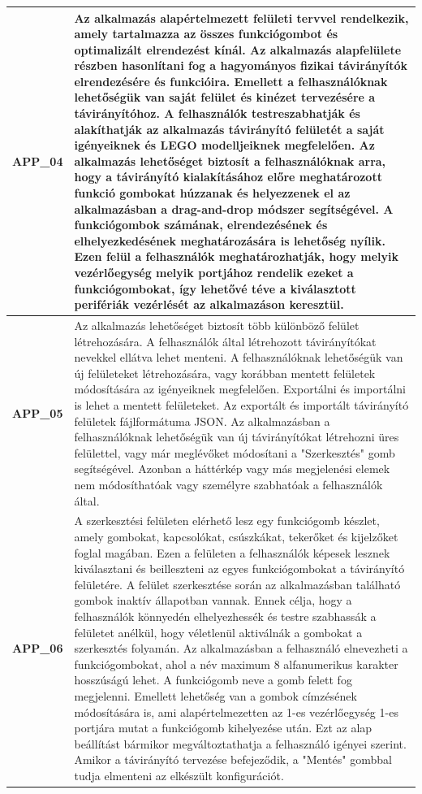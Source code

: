 \documentclass{article}
\begin{document}
\begin{longtable}{|c|p{14cm}|}
       \textbf{APP\_04}  & Az alkalmazás alapértelmezett felületi tervvel rendelkezik, amely tartalmazza az összes funkciógombot és optimalizált elrendezést kínál. Az alkalmazás alapfelülete részben hasonlítani fog a hagyományos fizikai távirányítók elrendezésére és funkcióira. Emellett a felhasználóknak lehetőségük van saját felület és kinézet tervezésére a távirányítóhoz. A felhasználók testreszabhatják és alakíthatják az alkalmazás távirányító felületét a saját igényeiknek és LEGO modelljeiknek megfelelően. Az alkalmazás lehetőséget biztosít a felhasználóknak arra, hogy a távirányító kialakításához előre meghatározott funkció gombokat húzzanak és helyezzenek el az alkalmazásban a drag-and-drop módszer segítségével. A funkciógombok számának, elrendezésének és elhelyezkedésének meghatározására is lehetőség nyílik. Ezen felül a felhasználók meghatározhatják, hogy melyik vezérlőegység melyik portjához rendelik ezeket a funkciógombokat, így lehetővé téve a kiválasztott perifériák vezérlését az alkalmazáson keresztül. \\\hline
       
       \textbf{APP\_05}  & Az alkalmazás lehetőséget biztosít több különböző felület létrehozására. A felhasználók által létrehozott távirányítókat nevekkel ellátva lehet menteni. A felhasználóknak lehetőségük van új felületeket létrehozására, vagy korábban mentett felületek módosítására az igényeiknek megfelelően. Exportálni és importálni is lehet a mentett felületeket. Az exportált és importált távirányító felületek fájlformátuma JSON. Az alkalmazásban a felhasználóknak lehetőségük van új távirányítókat létrehozni üres felülettel, vagy már meglévőket módosítani a "Szerkesztés" gomb segítségével. Azonban a háttérkép vagy más megjelenési elemek nem módosíthatóak vagy személyre szabhatóak a felhasználók által. \\\hline
       
       \textbf{APP\_06}  & A szerkesztési felületen elérhető lesz egy funkciógomb készlet, amely gombokat, kapcsolókat, csúszkákat, tekerőket és kijelzőket foglal magában. Ezen a felületen a felhasználók képesek lesznek kiválasztani és beilleszteni az egyes funkciógombokat a távirányító felületére. A felület szerkesztése során az alkalmazásban található gombok inaktív állapotban vannak. Ennek célja, hogy a felhasználók könnyedén elhelyezhessék és testre szabhassák a felületet anélkül, hogy véletlenül aktiválnák a gombokat a szerkesztés folyamán. Az alkalmazásban a felhasználó elnevezheti a funkciógombokat, ahol a név maximum 8 alfanumerikus karakter hosszúságú lehet. A funkciógomb neve a gomb felett fog megjelenni. Emellett lehetőség van a gombok címzésének módosítására is, ami alapértelmezetten az 1-es vezérlőegység 1-es portjára mutat a funkciógomb kihelyezése után. Ezt az alap beállítást bármikor megváltoztathatja a felhasználó igényei szerint. Amikor a távirányító tervezése befejeződik, a "Mentés" gombbal tudja elmenteni az elkészült konfigurációt. \\\hline


\end{longtable}
\end{document}

